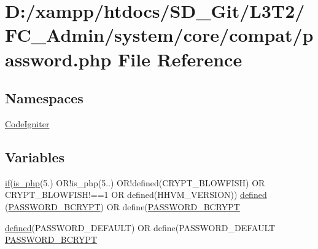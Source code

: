 \hypertarget{password_8php}{}\section{D\+:/xampp/htdocs/\+S\+D\+\_\+\+Git/\+L3\+T2/\+F\+C\+\_\+\+Admin/system/core/compat/password.php File Reference}
\label{password_8php}
\subsection*{Namespaces}
\begin{DoxyCompactItemize}
\item 
 \hyperlink{namespace_code_igniter}{Code\+Igniter}
\end{DoxyCompactItemize}
\subsection*{Variables}
\begin{DoxyCompactItemize}
\item 
\hyperlink{assets_2js_2bootstrap_8min_8js_a87cf461060832b8b68a7b48d9e371e4f}{if}(\hyperlink{_bootstrap_8php_acbea7ca989439eea4c6019ad3c5161aa}{is\+\_\+php}(\textquotesingle{}5.\textquotesingle{}) O\+R!is\+\_\+php(\textquotesingle{}5..\textquotesingle{}) O\+R!defined(\textquotesingle{}C\+R\+Y\+P\+T\+\_\+\+B\+L\+O\+W\+F\+I\+S\+H\textquotesingle{}) O\+R C\+R\+Y\+P\+T\+\_\+\+B\+L\+O\+W\+F\+I\+S\+H!==1 O\+R defined(\textquotesingle{}H\+H\+V\+M\+\_\+\+V\+E\+R\+S\+I\+O\+N\textquotesingle{})) \hyperlink{password_8php_aabb8e1f89683202c71f81779040eb22f}{defined} (\textquotesingle{}\hyperlink{password_8php_a71c35e51b9c76d5ecb437d588ab8f046}{P\+A\+S\+S\+W\+O\+R\+D\+\_\+\+B\+C\+R\+Y\+P\+T}\textquotesingle{}) O\+R define(\textquotesingle{}\hyperlink{password_8php_a71c35e51b9c76d5ecb437d588ab8f046}{P\+A\+S\+S\+W\+O\+R\+D\+\_\+\+B\+C\+R\+Y\+P\+T}\textquotesingle{}
\item 
\hyperlink{_bootstrap_8php_a46458e8654a714e0565e20f63021add9}{defined}(\textquotesingle{}P\+A\+S\+S\+W\+O\+R\+D\+\_\+\+D\+E\+F\+A\+U\+L\+T\textquotesingle{}) O\+R define(\textquotesingle{}P\+A\+S\+S\+W\+O\+R\+D\+\_\+\+D\+E\+F\+A\+U\+L\+T\textquotesingle{} \hyperlink{password_8php_a71c35e51b9c76d5ecb437d588ab8f046}{P\+A\+S\+S\+W\+O\+R\+D\+\_\+\+B\+C\+R\+Y\+P\+T}
\end{DoxyCompactItemize}


